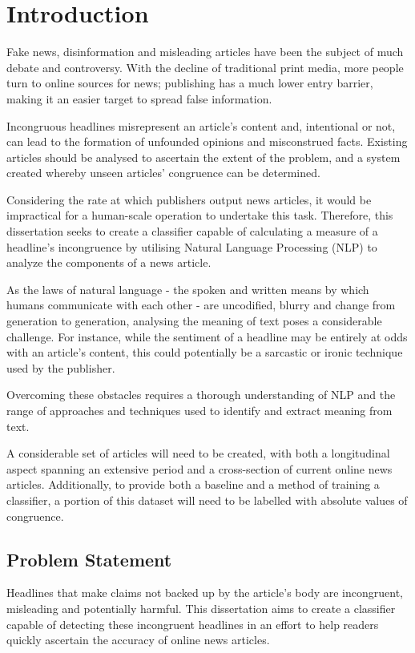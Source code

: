 \section{Introduction}
Fake news, disinformation and misleading articles have been the subject of much debate and controversy. With the decline of traditional print media, more people turn to online sources for news; publishing has a much lower entry barrier, making it an easier target to spread false information.

Incongruous headlines misrepresent an article's content and,
intentional or not, can lead to the formation of unfounded opinions and misconstrued facts. Existing articles should be analysed to ascertain the extent of the problem, and a system created whereby unseen articles' congruence can be determined.

Considering the rate at which publishers output news articles, it would be impractical for a human-scale operation to undertake this task. Therefore, this dissertation seeks to create a classifier capable of calculating a measure of a headline's incongruence by utilising Natural Language Processing (NLP) to analyze the components of a news article.

As the laws of natural language - the spoken and written means by which humans communicate with each other - are uncodified, blurry and change from generation to generation, analysing the meaning of text poses a considerable challenge. For instance, while the sentiment of a headline may be entirely at odds with an article's content, this could potentially be a sarcastic or ironic technique used by the publisher.

Overcoming these obstacles requires a thorough understanding of NLP and the range of approaches and techniques used to identify and extract meaning from text.

A considerable set of articles will need to be created, with both a
longitudinal aspect spanning an extensive period and a cross-section of current online news articles. Additionally, to provide both a baseline and a method of training a classifier, a portion of this dataset will need to be labelled with absolute values of congruence.


\subsection{Problem Statement}

Headlines that make claims not backed up by the article's body are incongruent, misleading and potentially harmful. This dissertation aims to create a classifier capable of detecting these incongruent headlines in an effort to help readers quickly ascertain the accuracy of online news articles.

